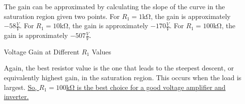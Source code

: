 \FloatBarrier

The gain can be approximated by calculating the slope of the curve in the saturation region given two points. For $R_1 = 1$\si{\kilo\ohm}, the gain is approximately $-58 \frac{V}{V}$. For $R_1 = 10$\si{\kilo\ohm}, the gain is approximately $-170 \frac{V}{V}$. For $R_1 = 100$\si{\kilo\ohm}, the gain is approximately $-507 \frac{V}{V}$. \\

\FloatBarrier

\begin{table}[h!]
	\centering
	\caption{Voltage Gain at Different $R_1$ Values}
	\label{tab:gain}
\end{table}

\FloatBarrier

Again, the best resistor value is the one that leads to the steepest descent, or equivalently highest gain, in the saturation region. This occurs when the load is largest. \uline{So, $R_1 = 100$\si{\kilo\ohm} is the best choice for a good voltage amplifier and inverter.} \\

